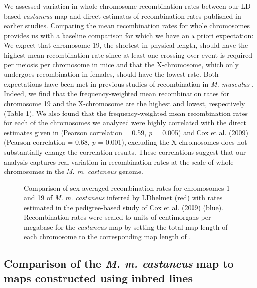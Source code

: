 We assessed variation in whole-chromosome recombination rates between our LD-based \textit{castaneus} map and direct estimates of recombination rates published in earlier studies. Comparing the mean recombination rates for whole chromosomes provides us with a baseline comparison for which we have an a priori expectation: We expect that chromosome 19, the shortest in physical length, should have the highest mean recombination rate since at least one crossing-over event is required per meiosis per chromosome in mice and that the X-chromosome, which only undergoes recombination in females, should have the lowest rate. Both expectations have been met in previous studies of recombination in \emph{M. musculus} \citep{RN320, 323}. Indeed, we find that the frequency-weighted mean recombination rates for chromosome 19 and the X-chromosome are the highest and lowest, respectively (Table 1). We also found that the frequency-weighted mean recombination rates for each of the chromosomes we analyzed were highly correlated with the direct estimates given in \cite{RN320} (Pearson correlation = 0.59, \emph{p} = 0.005) and Cox et al. (2009) (Pearson correlation = 0.68, \emph{p} = 0.001), excluding the X-chromosomes does not substantially change the correlation results. These correlations suggest that our analysis captures real variation in recombination rates at the scale of whole chromosomes in the \emph{M. m. castaneus} genome. 

\begin{figure}[h]
   \centering      
   \noindent{}
 \caption[Comparison of LD-based and pedigree-based recombination maps]{Comparison of sex-averaged recombination rates for chromosomes 1 and 19 of \emph{M. m. castaneus} inferred by LDhelmet (red) with rates estimated in the pedigree-based study of Cox et al. (2009) (blue). Recombination rates were scaled to units of centimorgans per megabase for the \textit{castaneus} map by setting the total map length of each chromosome to the corresponding map length of \cite{RN232}.}
\end{figure}

\linespread{1}

\linespread{2}


\subsection{Comparison of the \emph{M. m. castaneus} map to maps constructed using inbred lines}
 
